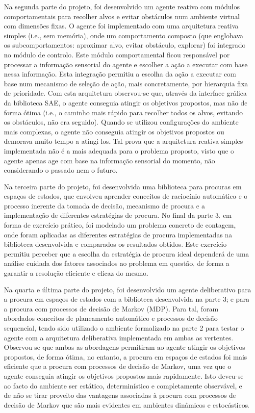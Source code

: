 Na segunda parte do projeto, foi desenvolvido um agente reativo com módulos comportamentais para recolher alvos e evitar obstáculos num ambiente virtual com dimensões fixas.
O agente foi implementado com uma arquitetura reativa simples (i.e., sem memória), onde um comportamento composto (que englobava os subcomportamentos: aproximar alvo, evitar obstáculo, explorar) foi integrado no módulo de controlo.
Este módulo comportamental ficou responsável por processar a informação sensorial do agente e escolher a ação a executar com base nessa informação.
Esta integração permitiu a escolha da ação a executar com base num mecanismo de seleção de ação, mais concretamente, por hierarquia fixa de prioridade.
Com esta arquitetura observou-se que, através da interface gráfica da biblioteca SAE, o agente conseguia atingir os objetivos propostos, mas não de forma ótima (i.e., o caminho mais rápido para recolher todos os alvos, evitando os obstáculos, não era seguido).
Quando se utilizou configurações do ambiente mais complexas, o agente não conseguia atingir os objetivos propostos ou demorava muito tempo a atingi-los.
Tal prova que a arquitetura reativa simples implementada não é a mais adequada para o problema proposto, visto que o agente apenas age com base na informação sensorial do momento, não considerando o passado nem o futuro.

Na terceira parte do projeto, foi desenvolvida uma biblioteca para procuras em espaços de estados, que envolveu aprender conceitos de raciocínio automático e o processo inerente da tomada de decisão, mecanismo de procura e a implementação de diferentes estratégias de procura.
No final da parte 3, em forma de exercício prático, foi modelado um problema concreto de contagem, onde foram aplicadas as diferentes estratégias de procura implementadas na biblioteca desenvolvida e comparados os resultados obtidos.
Este exercício permitiu perceber que a escolha da estratégia de procura ideal dependerá de uma análise cuidada dos fatores associados ao problema em questão, de forma a garantir a resolução eficiente e eficaz do mesmo.

Na quarta e última parte do projeto, foi desenvolvido um agente deliberativo para a procura em espaços de estados com a biblioteca desenvolvida na parte 3; e para a procura com processos de decisão de Markov (MDP).
Para tal, foram abordados conceitos de planeamento automático e processos de decisão sequencial, tendo sido utilizado o ambiente formalizado na parte 2 para testar o agente com a arquitetura deliberativa implementada em ambas as vertentes.
Observou-se que ambas as abordagens permitiram ao agente atingir os objetivos propostos, de forma ótima, no entanto, a procura em espaços de estados foi mais eficiente que a procura com processos de decisão de Markov, uma vez que o agente conseguia atingir os objetivos propostos mais rapidamente.
Isto deveu-se ao facto do ambiente ser estático, determinístico e completamente observável, e de não se tirar proveito das vantagens associadas à procura com processos de decisão de Markov que são mais evidentes em ambientes dinâmicos e estocásticos.

